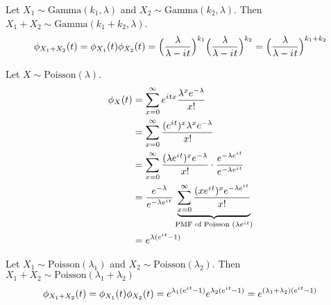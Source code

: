 \documentclass[12pt]{article}
\renewcommand{\i}{{i\mkern1mu}}
\begin{document}
Let $X_1 \sim \text{Gamma}(k_1, \lambda)$ and $X_2 \sim \text{Gamma}(k_2, \lambda)$. Then $X_1 + X_2 \sim \text{Gamma}(k_1 + k_2, \lambda)$. 
$$ \phi_{X_1 + X_2}(t) = \phi_{X_1}(t)\phi_{X_2}(t) = \Big( \frac{\lambda}{\lambda - \i t} \Big)^{k_1} \Big( \frac{\lambda}{\lambda - \i t} \Big)^{k_2} = \Big( \frac{\lambda}{\lambda - \i t} \Big)^{k_1 + k_2} $$ 

Let $X \sim \text{Poisson}(\lambda)$. $$ \begin{aligned} \phi_X(t) &= \sum_{x = 0}^\infty e^{\i tx} \frac{\lambda^x e^{-\lambda}}{x!} \\ &= \sum_{x = 0}^\infty \frac{(e^{\i t})^x \lambda^x e^{-\lambda}}{x!} \\ &= \sum_{x = 0}^\infty \frac{(\lambda e^{\i t})^x e^{-\lambda}}{x!} \cdot \frac{e^{-\lambda e^{\i t}}}{e^{-\lambda e^{\i t}}} \\ &= \frac{e^{-\lambda}}{e^{-\lambda e^{\i t}}} \underbrace{\sum_{x = 0}^\infty \frac{(xe^{\i t})^x e^{-\lambda e^{\i t}}}{x!}}_{\text{PMF of Poisson }(\lambda e^{\i t})} \\ &= e^{\lambda(e^{\i t} - 1)} \end{aligned} $$ 

Let $X_1 \sim \text{Poisson}(\lambda_1)$ and $X_2 \sim \text{Poisson}(\lambda_2)$. Then $X_1 + X_2 \sim \text{Poisson}(\lambda_1 + \lambda_2)$ 
$$ \phi_{X_1 + X_2}(t) = \phi_{X_1}(t)\phi_{X_2}(t) = e^{\lambda_1(e^{\i t} - 1)}e^{\lambda_2(e^{\i t}- 1)} = e^{(\lambda_1 + \lambda_2)(e^{\i t} - 1)} $$
\end{document}
